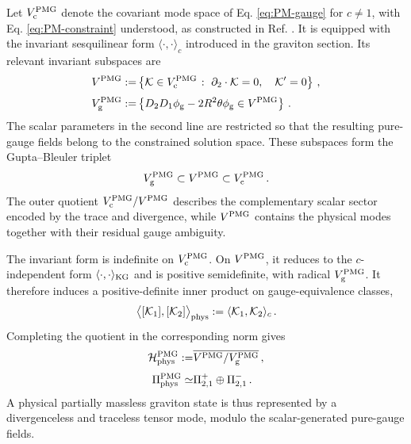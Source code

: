 \documentclass{SciPost}
\begin{document}
Let $V_{\rm c}^{\rm PMG}$ denote the covariant mode space of Eq. \eqref{eq:PM-gauge} for $c\neq1$, with Eq. \eqref{eq:PM-constraint} understood, as constructed in Ref. \cite{GravPartially}. It is equipped with the invariant sesquilinear form $\langle\cdot,\cdot\rangle_c$ introduced in the graviton section. Its relevant invariant subspaces are
\begin{align}
    V^{\rm PMG}
    :=&
    \left\{
        {\cal K}\in V_{\rm c}^{\rm PMG}
        \;\colon\;
        \partial_2\cdot{\cal K}=0,\quad
        {\cal K}^{\prime}=0
    \right\} \,,
    \\[3pt]
    V_{\rm g}^{\rm PMG}
    :=&
    \left\{
        D_2D_1\phi_{\rm g}
        -2R^2\theta\phi_{\rm g}
        \in V^{\rm PMG}
    \right\} \,.
\end{align}
The scalar parameters in the second line are restricted so that the resulting pure-gauge fields belong to the constrained solution space. These subspaces form the Gupta--Bleuler triplet
\begin{align}\label{eq:PM-GB}
    V_{\rm g}^{\rm PMG}
    \subset V^{\rm PMG}
    \subset V_{\rm c}^{\rm PMG} \,.
\end{align}
The outer quotient $V_{\rm c}^{\rm PMG}/V^{\rm PMG}$ describes the complementary scalar sector encoded by the trace and divergence, while $V^{\rm PMG}$ contains the physical modes together with their residual gauge ambiguity.

The invariant form is indefinite on $V_{\rm c}^{\rm PMG}$. On $V^{\rm PMG}$, it reduces to the $c$-independent form $\langle\cdot,\cdot\rangle_{\rm KG}$ and is positive semidefinite, with radical $V_{\rm g}^{\rm PMG}$. It therefore induces a positive-definite inner product on gauge-equivalence classes,
\begin{align}
    \bigl\langle[{\cal K}_1],[{\cal K}_2]\bigr\rangle_{\rm phys}
    :=
    \langle{\cal K}_1,{\cal K}_2\rangle_c \,.
\end{align}
Completing the quotient in the corresponding norm gives
\begin{align}\label{eq:PM-physical-space}
    {\cal H}_{\rm phys}^{\rm PMG}
    :=&
    \overline{
        V^{\rm PMG}/V_{\rm g}^{\rm PMG}
    } \,,
    \\[3pt]
    \Pi_{\rm phys}^{\rm PMG}
    \simeq&
    \Pi^+_{2,1}\oplus\Pi^-_{2,1} \,.
\end{align}
A physical partially massless graviton state is thus represented by a divergenceless and traceless tensor mode, modulo the scalar-generated pure-gauge fields.
\end{document}
